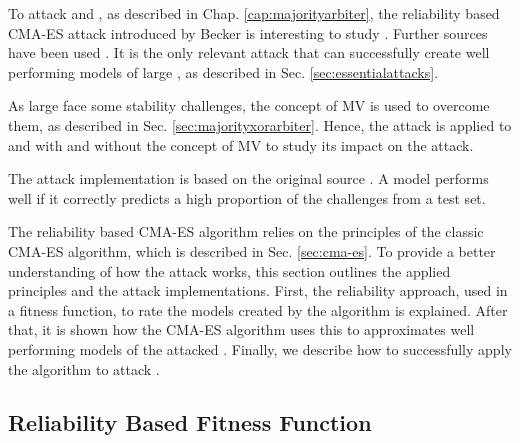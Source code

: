 To attack \mpufs and \mxpufs, as described in Chap. \ref{cap:majorityarbiter}, the reliability based \ac{CMA-ES} attack introduced by Becker is interesting to study \cite{Becker2015ThePUFs}.
Further sources have been used \cite{Becker2015ThePUFs,Wikipedia2017CMA-ES, Hansen2011TheTutorial, Hansen2006TheReview}. %
It is the only relevant attack that can successfully create well performing models of large \xpufs, as described in Sec. \ref{sec:essentialattacks}.

As large \xpufs face some stability challenges, the concept of \ac{MV} is used to overcome them, as described in Sec. \ref{sec:majorityxorarbiter}.
Hence, the attack is applied to \apufs and \xpufs with and without the concept of \ac{MV} to study its impact on the attack. %

The attack implementation is based on the original source \cite{Becker2015ThePUFs}.
A model performs well if it correctly predicts a high proportion of the challenges from a test set.

The reliability based \ac{CMA-ES} algorithm relies on the principles of the classic \ac{CMA-ES} algorithm, which is described in Sec. \ref{sec:cma-es}.
To provide a better understanding of how the attack works, this section outlines the applied principles and the attack implementations. %
First, the reliability approach, used in a fitness function, to rate the models created by the algorithm is explained.
After that, it is shown how the \ac{CMA-ES} algorithm uses this to approximates well performing models of the attacked \apuf.
Finally, we describe how to successfully apply the algorithm to attack \xpufs.


\subsection{Reliability Based Fitness Function}
\label{sec:reliability}

